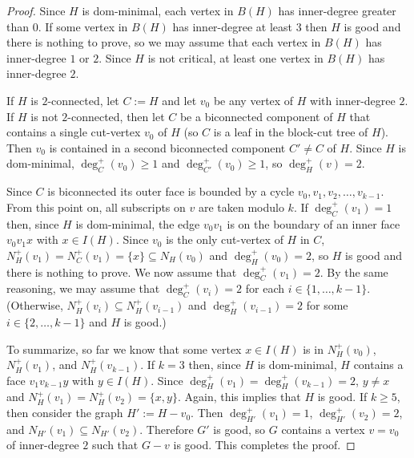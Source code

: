 \documentclass[12pt]{article}
\begin{document}
\begin{proof}
  Since $H$ is dom-minimal, each vertex in $B(H)$ has inner-degree greater than $0$.  If some vertex in $B(H)$ has inner-degree at least $3$ then $H$ is good and there is nothing to prove, so we may assume that each vertex in $B(H)$ has inner-degree $1$ or $2$.  Since $H$ is not critical, at least one vertex in $B(H)$ has inner-degree $2$.

  If $H$ is $2$-connected, let $C:=H$ and let $v_0$ be any vertex of $H$ with inner-degree $2$.  
  If $H$ is not $2$-connected, then let $C$ be a biconnected component of $H$ that contains a single cut-vertex $v_0$ of $H$ (so $C$ is a leaf in the block-cut tree of $H$). Then $v_0$ is contained in a second biconnected component $C'\neq C$ of $H$. Since $H$ is dom-minimal, $\deg^+_{C}(v_0)\ge 1$ and $\deg^+_{C'}(v_0)\ge 1$, so $\deg^+_H(v)= 2$.

  Since $C$ is biconnected its outer face is bounded by a cycle $v_0,v_1,v_2,\ldots,v_{k-1}$.  From this point on, all subscripts on $v$ are taken modulo $k$.  If $\deg^+_C(v_1)=1$ then, since $H$ is dom-minimal, the edge $v_0v_1$ is on the boundary of an inner face $v_0v_1x$ with $x\in I(H)$.  Since $v_0$ is the only cut-vertex of $H$ in $C$, $N^+_H(v_1)=N^+_C(v_1)=\{x\}\subseteq N_H(v_0)$ and $\deg^+_H(v_0)=2$, so $H$ is good and there is nothing to prove.  We now assume that $\deg^+_C(v_1)=2$.  By the same reasoning, we may assume that $\deg^+_C(v_i)=2$ for each $i\in\{1,\ldots,k-1\}$.  (Otherwise, $N^+_H(v_i)\subseteq N^+_H(v_{i-1})$ and $\deg^+_H(v_{i-1})=2$ for some $i\in\{2,\ldots,k-1\}$ and $H$ is good.)

  To summarize, so far we know that some vertex $x\in I(H)$ is in $N^+_H(v_0)$, $N^+_H(v_1)$, and $N^+_H(v_{k-1})$.  If $k=3$ then, since $H$ is dom-minimal, $H$ contains a face $v_1v_{k-1}y$ with $y\in I(H)$.  Since $\deg^+_H(v_1)=\deg^+_H(v_{k-1})=2$, $y\neq x$ and $N^+_H(v_1)=N^+_H(v_2)=\{x,y\}$. Again, this implies that $H$ is good.  If $k\ge 5$, then consider the graph $H':=H-v_0$.  Then $\deg^+_{H'}(v_1)=1$, $\deg^+_{H'}(v_2)=2$, and $N_{H'}(v_1)\subseteq N_{H'}(v_2)$.   Therefore $G'$ is good, so $G$ contains a vertex $v=v_0$ of inner-degree $2$ such that $G-v$ is good.  This completes the proof.
\end{proof}
\end{document}
